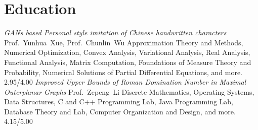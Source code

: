 \documentclass[11pt,a4paper, final]{moderncv}
\newcommand{\spacesubsection}{\vspace{0.2cm}}
\begin{document}
\section{\textbf{Education}}
	{\emph{GANs based Personal style imitation of Chinese handwritten characters}}
	{Prof.~Yunhua~Xue, Prof.~Chunlin~Wu}
	{Approximation Theory and Methods, Numerical Optimization, Convex Analysis, 
	Variational Analysis, Real Analysis, Functional Analysis, Matrix Computation, 
	Foundations of Measure Theory and Probability, Numerical Solutions of Partial Differential Equations, and more.}
	{2.95/4.00}
	{\emph{Improved Upper Bounds of Roman Domination Number in Maximal Outerplanar Graphs}}
	{Prof.~Zepeng~Li}
	{Discrete Mathematics, Operating Systems, Data Structures, C and C++ Programming Lab, 
	Java Programming Lab, Database Theory and Lab, Computer Organization and Design, and more.}
	{4.15/5.00}
\end{document}
